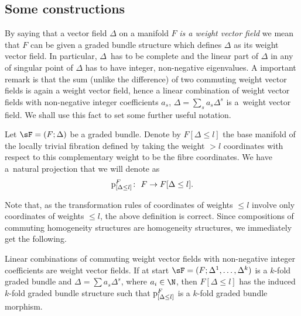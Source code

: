 \subsection{Some constructions}
By saying that a vector f\/ield $\Delta$ on a manifold $F$ \emph{is a weight vector field} we mean that $F$ can be given a graded bundle structure which def\/ines $\Delta$ as its weight vector f\/ield. In particular, $\Delta$~has to be complete and the linear part of $\Delta$ in any of singular point of $\Delta$ has to have integer, non-negative eigenvalues. A important remark \cite[Remark~5.2]{JG_MR_higher_vb} is that the sum (unlike the dif\/ference) of two commuting weight vector f\/ields is again a weight vector f\/ield, hence a linear combination of weight vector f\/ields with non-negative integer coef\/f\/icients $a_s$, $\Delta = \sum_s a_s \Delta^s$ is a~weight vector f\/ield. We shall use this fact to set some further useful notation.

\begin{Definition}\label{def:removal_coordinates1} Let $\sF = (F; \Delta)$ be a graded bundle.
Denote by $F[\Delta \leq l]$ the base manifold of the locally trivial f\/ibration def\/ined by taking the weight $>l$ coordinates with respect to this complementary weight to be the f\/ibre coordinates. We have a~natural projection that we will denote as
\begin{gather*}
\textnormal{p}^F_{[\Delta \leq l]}\colon \  F \rightarrow F[\Delta \leq l].
\end{gather*}
\end{Definition}
Note that, as the transformation rules of coordinates of weights $\le l$ involve only coordinates of weights $\le l$, the above def\/inition is correct. Since compositions of commuting homogeneity structures are homogeneity structures, we immediately get the following.
\begin{Proposition} Linear combinations of commuting weight vector fields with non-negative integer coefficients are weight vector fields. If at start $\sF = (F; \Delta^1, \ldots, \Delta^k)$ is a $k$-fold graded bundle and $\Delta=\sum a_s \Delta^s$, where $a_i\in\N$, then $F[\Delta \leq l]$ has the induced $k$-fold graded bundle structure such that $\textnormal{p}^F_{[\Delta \leq l]}$ is a $k$-fold graded bundle morphism.
\end{Proposition}


